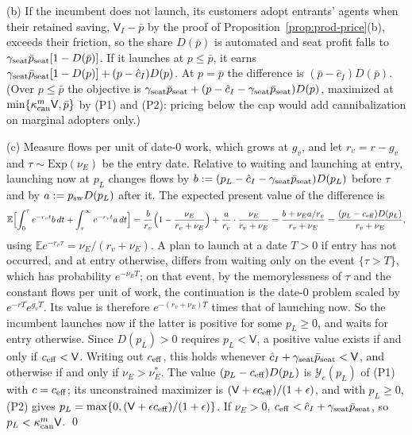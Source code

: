 (b) If the incumbent does not launch, its customers adopt entrants' agents when their retained saving, $\mathsf V_I-\bar p$ by the proof of Proposition~\ref{prop:prod-price}(b), exceeds their friction, so the share $D(\bar p)$ is automated and seat profit falls to $\gamma_{\rm seat}\bar p_{\rm seat}[1-D(\bar p)]$. If it launches at $p\le\bar p$, it earns $\gamma_{\rm seat}\bar p_{\rm seat}[1-D(p)]+(p-\hat c_I)D(p)$. At $p=\bar p$ the difference is $(\bar p-\hat c_I)D(\bar p)$. (Over $p\le\bar p$ the objective is $\gamma_{\rm seat}\bar p_{\rm seat}+(p-\hat c_I-\gamma_{\rm seat}\bar p_{\rm seat})D(p)$, maximized at $\min\{\kappa^m_{\rm can}\mathsf V,\bar p\}$ by (P1) and (P2): pricing below the cap would add cannibalization on marginal adopters only.)

(c) Measure flows per unit of date-0 work, which grows at $g_v$, and let $r_v=r-g_v$ and $\tau\sim\mathrm{Exp}(\nu_E)$ be the entry date. Relative to waiting and launching at entry, launching now at $p_L$ changes flows by $b:=(p_L-\hat c_I-\gamma_{\rm seat}\bar p_{\rm seat})D(p_L)$ before $\tau$ and by $a:=p_{\rm sw}D(p_L)$ after it. The expected present value of the difference is
\[
\mathbb E\Bigl[\int_0^\tau e^{-r_vt}b\,dt+\int_\tau^\infty e^{-r_vt}a\,dt\Bigr]=\frac b{r_v}\Bigl(1-\frac{\nu_E}{r_v+\nu_E}\Bigr)+\frac a{r_v}\cdot\frac{\nu_E}{r_v+\nu_E}=\frac{b+\nu_Ea/r_v}{r_v+\nu_E}=\frac{(p_L-c_{\rm eff})D(p_L)}{r_v+\nu_E},
\]
using $\mathbb Ee^{-r_v\tau}=\nu_E/(r_v+\nu_E)$. A plan to launch at a date $T>0$ if entry has not occurred, and at entry otherwise, differs from waiting only on the event $\{\tau>T\}$, which has probability $e^{-\nu_ET}$; on that event, by the memorylessness of $\tau$ and the constant flows per unit of work, the continuation is the date-0 problem scaled by $e^{-rT}e^{g_vT}$. Its value is therefore $e^{-(r_v+\nu_E)T}$ times that of launching now. So the incumbent launches now if the latter is positive for some $p_L\ge 0$, and waits for entry otherwise. Since $D(p_L)>0$ requires $p_L<\mathsf V$, a positive value exists if and only if $c_{\rm eff}<\mathsf V$. Writing out $c_{\rm eff}$, this holds whenever $\hat c_I+\gamma_{\rm seat}\bar p_{\rm seat}<\mathsf V$, and otherwise if and only if $\nu_E>\nu_E^*$. The value $(p_L-c_{\rm eff})D(p_L)$ is $\mathcal Y_c(p_L)$ of (P1) with $c=c_{\rm eff}$; its unconstrained maximizer is $(\mathsf V+\epsilon c_{\rm eff})/(1+\epsilon)$, and with $p_L\ge 0$, (P2) gives $p_L=\max\{0,(\mathsf V+\epsilon c_{\rm eff})/(1+\epsilon)\}$. If $\nu_E>0$, $c_{\rm eff}<\hat c_I+\gamma_{\rm seat}\bar p_{\rm seat}$, so $p_L<\kappa^m_{\rm can}\mathsf V$. \qed

